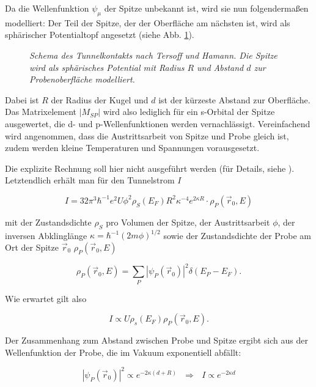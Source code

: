 % 

% 
Da die Wellenfunktion $\psi_{\mu}$ der Spitze unbekannt ist, wird sie
nun folgendermaßen modelliert: Der Teil der Spitze, der der Oberfläche am nächsten ist, wird als
sphärischer Potentialtopf angesetzt (siehe Abb. \ref{spitze}). 
\begin{figure}[htbp]
\centering
\sffamily 

\caption{\textit{Schema des Tunnelkontakts nach Tersoff und Hamann. Die Spitze wird als sphärisches
Potential mit Radius $R$ und Abstand $d$ zur Probenoberfläche modelliert.}}
\label{spitze}
\end{figure}
Dabei ist $R$ der Radius der Kugel
und $d$ ist der kürzeste Abstand zur Oberfläche. Das Matrixelement $|M_{SP}|$ wird
also lediglich für ein s-Orbital der Spitze ausgewertet, die d- und p-Wellenfunktionen werden
vernachlässigt. Vereinfachend wird angenommen, dass die Austrittsarbeit von Spitze und
Probe gleich ist, zudem werden kleine Temperaturen und Spannungen vorausgesetzt.
 
 Die explizite Rechnung soll hier nicht ausgeführt werden (für Details, siehe \cite{Ter83}).
 Letztendlich erhält man für den Tunnelstrom $I$
 
 \[I=32\pi^3\hbar^{-1}e^2U\phi^2\rho_{S}(E_F)R^2\kappa^{-4}e^{2\kappa
 R}\cdot\rho_P(\vec{r}_0, E)\]
 
 mit der Zustandsdichte $\rho_{S}$ pro Volumen der Spitze, der Austrittsarbeit $\phi$, der inversen
 Abklinglänge $\kappa=\hbar^{-1}(2m\phi)^{1/2}$ sowie der Zustandsdichte der Probe am Ort der Spitze
 $\vec{r}_0$ $\rho_P(\vec{r}_0, E)$
 
 \[\rho_P(\vec{r}_0, E)=\sum_{P}|\psi_{P}(\vec{r}_0)|^2\delta(E_{P}-E_F).\]
 
 Wie erwartet gilt also
 
 \[I\propto U \rho_{s}(E_F) \rho_P(\vec{r}_0, E).\]
 
 Der Zusammenhang zum Abstand zwischen Probe und Spitze ergibt sich aus der
 Wellenfunktion der Probe, die im Vakuum exponentiell abfällt:
 
 \[|\psi_P(\vec{r}_0)|^2\propto e^{-2\kappa(d+R)}~~~\Rightarrow~~~I\propto e^{-2\kappa d}\]
 
